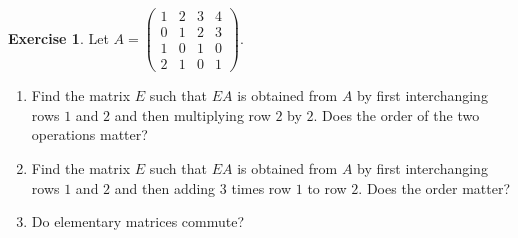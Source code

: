 \documentclass[12pt]{article}
\theoremstyle{definition}
\newtheorem{exercise}{Exercise}
\begin{document}
\begin{exercise}\label{r2-ex-order}
Let \(A=\begin{pmatrix}1&2&3&4\\0&1&2&3\\1&0&1&0\\2&1&0&1\end{pmatrix}\).
\begin{enumerate}
\item Find the matrix \(E\) such that \(EA\) is obtained from \(A\) by first interchanging rows
\(1\) and \(2\) and then multiplying row \(2\) by \(2\). Does the order of the two operations
matter?
\item Find the matrix \(E\) such that \(EA\) is obtained from \(A\) by first interchanging rows
\(1\) and \(2\) and then adding \(3\) times row \(1\) to row \(2\). Does the order matter?
\item Do elementary matrices commute?
\end{enumerate}
\end{exercise}
\end{document}
